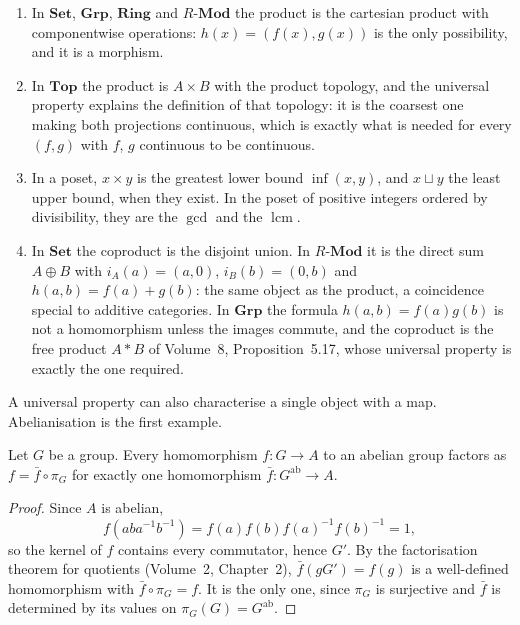 \begin{example}\label{ex:products}
\leavevmode
\begin{enumerate}[label=(\alph*)]
\item In $\mathbf{Set}$, $\mathbf{Grp}$, $\mathbf{Ring}$ and $R\text{-}\mathbf{Mod}$ the product is the cartesian product with componentwise operations: $h(x)=(f(x),g(x))$ is the only possibility, and it is a
morphism.
\item In $\mathbf{Top}$ the product is $A\times B$ with the product topology, and the universal property explains the definition of that topology: it is the coarsest one making both projections
continuous, which is exactly what is needed for every $(f,g)$ with $f$, $g$ continuous to be continuous.
\item In a poset, $x\times y$ is the greatest lower bound $\inf(x,y)$, and $x\sqcup y$ the least upper bound, when they exist. In the poset of positive integers ordered by divisibility, they are the
$\gcd$ and the $\operatorname{lcm}$.
\item In $\mathbf{Set}$ the coproduct is the disjoint union. In $R\text{-}\mathbf{Mod}$ it is the direct sum $A\oplus B$ with $i_A(a)=(a,0)$, $i_B(b)=(0,b)$ and $h(a,b)=f(a)+g(b)$: the same object as the product,
a coincidence special to additive categories. In $\mathbf{Grp}$ the formula $h(a,b)=f(a)g(b)$ is not a homomorphism unless the images commute, and the coproduct is the free product $A*B$ of Volume~8,
Proposition~5.17, whose universal property is exactly the one required.
\end{enumerate}
\end{example}

A universal property can also characterise a single object with a map. Abelianisation is the first example.

\begin{proposition}\label{prop:abuniv}
Let $G$ be a group. Every homomorphism $f\colon G\to A$ to an abelian group factors as $f=\bar f\circ\pi_G$ for exactly one homomorphism $\bar f\colon G^{\mathrm{ab}}\to A$.
\end{proposition}

\begin{proof}
Since $A$ is abelian,
\[f(aba^{-1}b^{-1})=f(a)f(b)f(a)^{-1}f(b)^{-1}=1,\]
so the kernel of $f$ contains every commutator, hence $G'$. By the factorisation theorem for quotients (Volume~2, Chapter~2), $\bar f(gG')=f(g)$ is a
well-defined homomorphism with $\bar f\circ\pi_G=f$. It is the only one, since $\pi_G$ is surjective and $\bar f$ is determined by its values on $\pi_G(G)=G^{\mathrm{ab}}$.
\end{proof}

